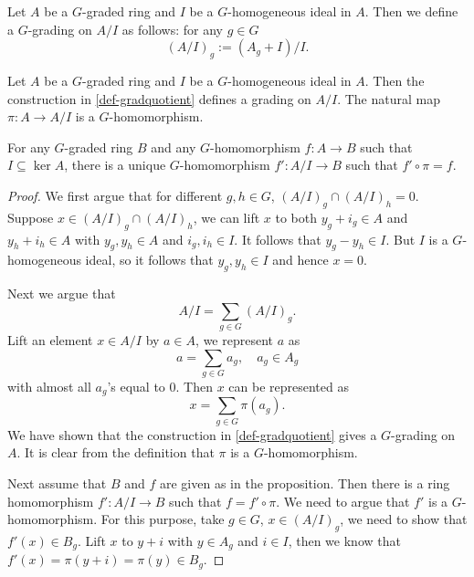 \begin{definition}\label{def-gradquotient}
    Let $A$ be a $G$-graded ring and $I$ be a $G$-homogeneous ideal in $A$. Then we define a $G$-grading on $A/I$ as follows: for any $g\in G$
    \[
        (A/I)_g:= (A_g+I)/I.
    \]
\end{definition}
\begin{proposition}
    Let $A$ be a $G$-graded ring and $I$ be a $G$-homogeneous ideal in $A$. Then the construction in \cref{def-gradquotient} defines a grading on $A/I$. The natural map $\pi:A\rightarrow A/I$ is a $G$-homomorphism.

    For any $G$-graded ring $B$ and any $G$-homomorphism $f:A\rightarrow B$ such that $I\subseteq \ker A$, there is a unique $G$-homomorphism $f':A/I\rightarrow B$ such that $f'\circ \pi=f$.
\end{proposition} 
\begin{proof}
    We first argue that for different $g,h\in G$, $(A/I)_g\cap (A/I)_h=0$. Suppose $x\in (A/I)_g\cap (A/I)_h$, we can lift $x$ to both $y_g+i_g\in A$ and $y_h+i_h\in A$ with $y_g,y_h\in A$ and $i_g,i_h\in I$. It follows that $y_g-y_h\in I$. But $I$ is a $G$-homogeneous ideal, so it follows that $y_g,y_h\in I$ and hence $x=0$.

    Next we argue that
    \[
        A/I=\sum_{g\in G}  (A/I)_g.
    \]
    Lift an element $x\in A/I$ by $a\in A$, we represent $a$ as
    \[
        a=\sum_{g\in G} a_g,\quad a_g\in A_g 
    \]
    with almost all $a_g$'s equal to $0$. Then $x$ can be represented as
    \[
        x=\sum_{g\in G}\pi(a_g).  
    \]
    We have shown that the construction in \cref{def-gradquotient} gives a $G$-grading on $A$. It is clear from the definition that $\pi$ is a $G$-homomorphism.

    Next assume that $B$ and $f$ are given as in the proposition. Then there is a ring homomorphism $f':A/I\rightarrow B$ such that $f=f'\circ \pi$. We need to argue that $f'$ is a $G$-homomorphism. For this purpose, take $g\in G$, $x\in (A/I)_g$, we need to show that $f'(x)\in B_g$. Lift $x$ to $y+i$ with $y\in A_g$ and $i\in I$, then we know that $f'(x)=\pi(y+i)=\pi(y)\in B_g$.    
\end{proof}

